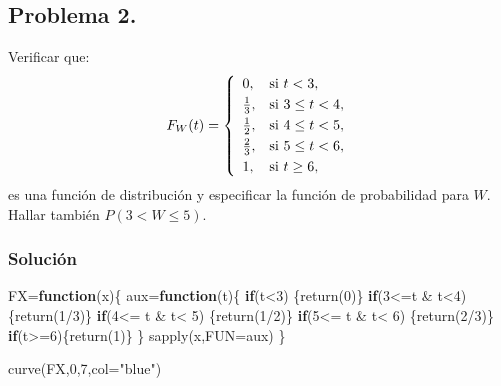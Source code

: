 \documentclass[
]{article}
\newenvironment{Shaded}{\begin{snugshade}}{\end{snugshade}}
\newcommand{\AttributeTok}[1]{\textcolor[rgb]{0.77,0.63,0.00}{#1}}
\newcommand{\ControlFlowTok}[1]{\textcolor[rgb]{0.13,0.29,0.53}{\textbf{#1}}}
\newcommand{\DecValTok}[1]{\textcolor[rgb]{0.00,0.00,0.81}{#1}}
\newcommand{\FunctionTok}[1]{\textcolor[rgb]{0.00,0.00,0.00}{#1}}
\newcommand{\NormalTok}[1]{#1}
\newcommand{\OtherTok}[1]{\textcolor[rgb]{0.56,0.35,0.01}{#1}}
\newcommand{\SpecialCharTok}[1]{\textcolor[rgb]{0.00,0.00,0.00}{#1}}
\newcommand{\StringTok}[1]{\textcolor[rgb]{0.31,0.60,0.02}{#1}}
\begin{document}
\hypertarget{problema-2.}{%
\subsection{Problema 2.}\label{problema-2.}}

Verificar que: \[F_W (t)=
\left\{\begin{array}{ll}
0, & \mbox{si $t<3$},
 \\[0.1cm]
{1\over 3}, & \mbox{si $3\leq t<4$},
 \\[0.1cm]
{1\over 2}, & \mbox{si $4\leq t<5$},
 \\[0.1cm] 
{2\over 3}, & \mbox{si $5\leq t<6$},
 \\[0.1cm] 
1, & \mbox{si $t\geq 6$},
\end{array}\right.
\] es una función de distribución y especificar la función de
probabilidad para \(W\). Hallar también \(P(3<W\leq 5)\).

\hypertarget{soluciuxf3n-1}{%
\subsubsection{Solución}\label{soluciuxf3n-1}}

\begin{Shaded}
\begin{Highlighting}[]
\NormalTok{FX}\OtherTok{=}\ControlFlowTok{function}\NormalTok{(x)\{}
\NormalTok{  aux}\OtherTok{=}\ControlFlowTok{function}\NormalTok{(t)\{}
    \ControlFlowTok{if}\NormalTok{(t}\SpecialCharTok{\textless{}}\DecValTok{3}\NormalTok{) \{}\FunctionTok{return}\NormalTok{(}\DecValTok{0}\NormalTok{)\}}
    \ControlFlowTok{if}\NormalTok{(}\DecValTok{3}\SpecialCharTok{\textless{}=}\NormalTok{t }\SpecialCharTok{\&}\NormalTok{ t}\SpecialCharTok{\textless{}}\DecValTok{4}\NormalTok{) \{}\FunctionTok{return}\NormalTok{(}\DecValTok{1}\SpecialCharTok{/}\DecValTok{3}\NormalTok{)\}}
    \ControlFlowTok{if}\NormalTok{(}\DecValTok{4}\SpecialCharTok{\textless{}=}\NormalTok{ t }\SpecialCharTok{\&}\NormalTok{ t}\SpecialCharTok{\textless{}} \DecValTok{5}\NormalTok{) \{}\FunctionTok{return}\NormalTok{(}\DecValTok{1}\SpecialCharTok{/}\DecValTok{2}\NormalTok{)\}}
    \ControlFlowTok{if}\NormalTok{(}\DecValTok{5}\SpecialCharTok{\textless{}=}\NormalTok{ t }\SpecialCharTok{\&}\NormalTok{ t}\SpecialCharTok{\textless{}} \DecValTok{6}\NormalTok{) \{}\FunctionTok{return}\NormalTok{(}\DecValTok{2}\SpecialCharTok{/}\DecValTok{3}\NormalTok{)\}}
    \ControlFlowTok{if}\NormalTok{(t}\SpecialCharTok{\textgreater{}=}\DecValTok{6}\NormalTok{)\{}\FunctionTok{return}\NormalTok{(}\DecValTok{1}\NormalTok{)\}}
\NormalTok{    \}}
  \FunctionTok{sapply}\NormalTok{(x,}\AttributeTok{FUN=}\NormalTok{aux)}
\NormalTok{\}}

\FunctionTok{curve}\NormalTok{(FX,}\DecValTok{0}\NormalTok{,}\DecValTok{7}\NormalTok{,}\AttributeTok{col=}\StringTok{"blue"}\NormalTok{)}
\end{Highlighting}
\end{Shaded}
\end{document}
